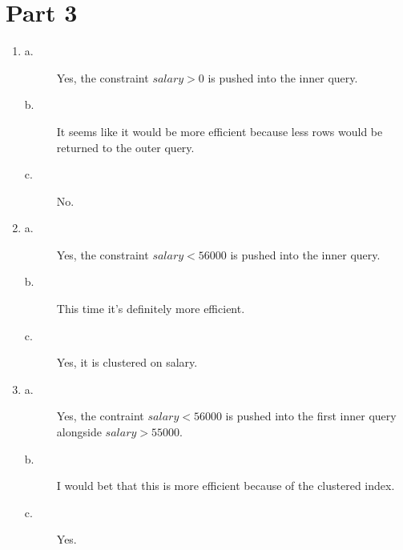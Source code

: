 \documentclass{article}
\begin{document}
\section*{Part 3}
\begin{enumerate}
\item
\begin{description}
\item[a.]
Yes, the constraint $salary > 0$ is pushed into the inner query.

\item[b.]
It seems like it would be more efficient because less rows would be
returned to the outer query.

\item[c.]
No.

\end{description}

\item
\begin{description}
\item[a.]
Yes, the constraint $salary < 56000$ is pushed into the inner query.

\item[b.]
This time it's definitely more efficient.

\item[c.]
Yes, it is clustered on salary.

\end{description}

\item
\begin{description}
\item[a.]
Yes, the contraint $salary < 56000$ is pushed into the first inner query
alongside $salary > 55000$.

\item[b.]
I would bet that this is more efficient because of the clustered index.

\item[c.]
Yes.

\end{description}

\end{enumerate}
\end{document}
